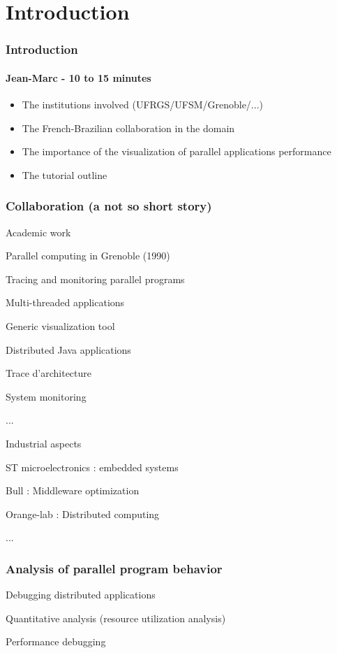 \section{Introduction}

\frame
{
  \frametitle{Introduction}
  \framesubtitle{Jean-Marc - 10 to 15 minutes}

  \begin{itemize}
  \item The institutions involved (UFRGS/UFSM/Grenoble/...)
  \item The French-Brazilian collaboration in the domain
  \item The importance of the visualization of parallel applications performance
  \item The tutorial outline
  \end{itemize}
}
\begin{frame}

\frametitle{Collaboration (a not so short story)}
\begin{block}{Academic  work}
\begin{description}
\item Parallel computing in Grenoble (1990)
\item Tracing and monitoring parallel programs
\item Multi-threaded applications
\item Generic visualization tool
\item Distributed Java applications
\item Trace d'architecture
\item System monitoring 
\item ...
\end{description}
\end{block}
\begin{block}{Industrial aspects}
\begin{description}
\item ST microelectronics : embedded systems
\item Bull : Middleware optimization
\item Orange-lab : Distributed computing
\item ...
\end{description}
\end{block}
\end{frame}


\begin{frame}
\frametitle{Analysis of parallel program behavior}
\begin{description}
\item Debugging distributed applications
\item Quantitative analysis (resource utilization analysis) 
\item Performance debugging
\end{description}
\end{frame}

